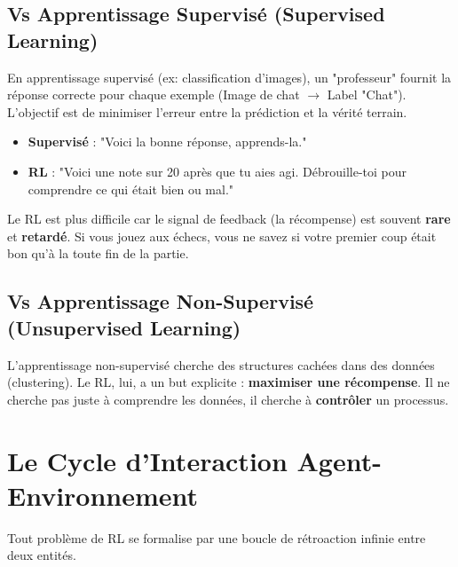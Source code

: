 \documentclass[a4paper,12pt]{report}
\begin{document}
\subsection{Vs Apprentissage Supervisé (Supervised Learning)}
En apprentissage supervisé (ex: classification d'images), un "professeur" fournit la réponse correcte pour chaque exemple (Image de chat $\to$ Label "Chat"). L'objectif est de minimiser l'erreur entre la prédiction et la vérité terrain.
\begin{itemize}
    \item \textbf{Supervisé} : "Voici la bonne réponse, apprends-la."
    \item \textbf{RL} : "Voici une note sur 20 après que tu aies agi. Débrouille-toi pour comprendre ce qui était bien ou mal."
\end{itemize}
Le RL est plus difficile car le signal de feedback (la récompense) est souvent \textbf{rare} et \textbf{retardé}. Si vous jouez aux échecs, vous ne savez si votre premier coup était bon qu'à la toute fin de la partie.

\subsection{Vs Apprentissage Non-Supervisé (Unsupervised Learning)}
L'apprentissage non-supervisé cherche des structures cachées dans des données (clustering). Le RL, lui, a un but explicite : \textbf{maximiser une récompense}. Il ne cherche pas juste à comprendre les données, il cherche à \textbf{contrôler} un processus.

\section{Le Cycle d'Interaction Agent-Environnement}
Tout problème de RL se formalise par une boucle de rétroaction infinie entre deux entités.
\end{document}
